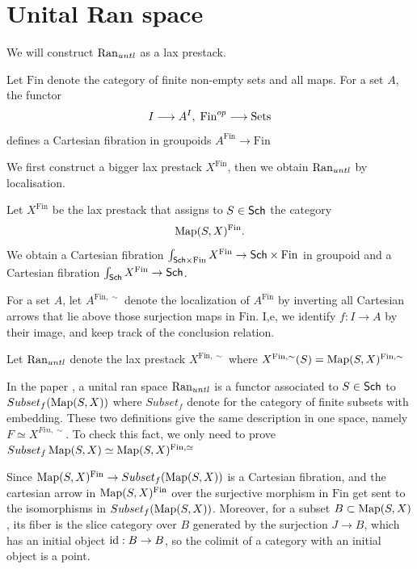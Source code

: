 \documentclass[oneside]{amsart}
\newcommand{\Fin}{\mathrm{Fin}}
\newcommand{\Sets}{\mathrm{Sets}}
\begin{document}
\section{Unital Ran space}
We will construct $\operatorname{Ran}_{untl}$ as a lax prestack.
\begin{notation}
    Let $\Fin$ denote the category of finite non-empty sets and all maps. For a set $A$, the functor
    \[  
    I \to A^I, \thickspace \Fin^{op} \to \Sets 
    \]
    defines a Cartesian fibration in groupoids $A^{\Fin} \to \Fin$
\end{notation}
We first construct a bigger lax prestack $X^{\Fin}$, then we obtain $\operatorname{Ran}_{untl}$ by localisation.
\begin{definition}
    Let $X^{\Fin}$ be the lax prestack that assigns to $S \in \mathsf{Sch}$ the category \[   
    \Map(S,X)^{\Fin}.
    \]
    We obtain a Cartesian fibration $\int_{\Sch \times \Fin} X^{\Fin} \to \Sch \times \Fin$ in groupoid and a Cartesian fibration $\int_{\Sch} X^{\Fin}  \to \Sch$.
\end{definition}

\begin{notation}
    For a set $A$, let $A^{\Fin,\sim}$ denote the localization of $A^{\Fin}$ by inverting all Cartesian arrows that lie above those surjection maps in $\Fin$. I,e, we identify  $f \colon I \to A $ by their image, and keep track of the conclusion relation.
\end{notation}

\begin{definition}
    Let $\operatorname{Ran}_{untl}$ denote the lax prestack $X^{\Fin, \sim}$ where $X^{\Fin, \sim} (S) = \Map(S,X)^{\Fin,\sim}$
\end{definition}

\begin{remark}
    In the paper \cite{abott}, a unital ran space $\operatorname{Ran}_{untl}$ is a functor associated to $S \in \mathsf{Sch}$ to $Subset_f(\operatorname{Map}(S,X))$ where $Subset_f$ denote for the category of finite subsets with embedding. These two definitions give the same description in one space, namely $F \simeq X^{Fin,\sim}$. To check this fact, we only need to prove $Subset_f\Map(S, X) \simeq \Map(S,X)^{\Fin,\simeq}$

    Since $\Map(S, X)^{\Fin} \to Subset_f(\Map(S,X))$ is a Cartesian fibration, and the cartesian arrow in $\Map(S,X)^{\Fin}$ over the surjective morphism in $\Fin$ get sent to the isomorphisms in $Subset_f(\operatorname{Map}(S,X))$. Moreover, for a subset $B \subset \operatorname{Map}(S,X)$, its fiber is  the slice category over $B$ generated by the  surjection $J \to B$, which has an initial object $\id: B \to B$, so the colimit of a category with an initial object is a point.
\end{remark}
\end{document}
